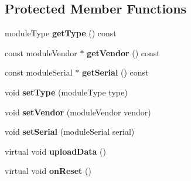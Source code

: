 \subsection*{Protected Member Functions}
\begin{DoxyCompactItemize}
\item 
\mbox{\label{classwood_box_1_1module_1_1_a_wood_box_module_a3b65bbb2626732d8b3b74fe12f906b92}} 
module\+Type {\bfseries get\+Type} () const
\item 
\mbox{\label{classwood_box_1_1module_1_1_a_wood_box_module_a9f2186691a9d548893a383fc556688d2}} 
const module\+Vendor $\ast$ {\bfseries get\+Vendor} () const
\item 
\mbox{\label{classwood_box_1_1module_1_1_a_wood_box_module_ab5559e873ed11270c61365ea8b26eacf}} 
const module\+Serial $\ast$ {\bfseries get\+Serial} () const
\item 
\mbox{\label{classwood_box_1_1module_1_1_a_wood_box_module_a4bc752c11d9e2bfb530f0748b75d2d00}} 
void {\bfseries set\+Type} (module\+Type type)
\item 
\mbox{\label{classwood_box_1_1module_1_1_a_wood_box_module_a9d16f6012096f4094ae72b7201f99dc5}} 
void {\bfseries set\+Vendor} (module\+Vendor vendor)
\item 
\mbox{\label{classwood_box_1_1module_1_1_a_wood_box_module_af790c7fb994eb79047fc3241221fddad}} 
void {\bfseries set\+Serial} (module\+Serial serial)
\item 
\mbox{\label{classwood_box_1_1module_1_1_a_wood_box_module_aef146d42e56b291ad03f602bb0f4dd0d}} 
virtual void {\bfseries upload\+Data} ()
\item 
\mbox{\label{classwood_box_1_1module_1_1_a_wood_box_module_a6792c3d27575bcfef80346976e255227}} 
virtual void {\bfseries on\+Reset} ()
\item 

\end{DoxyCompactItemize}
